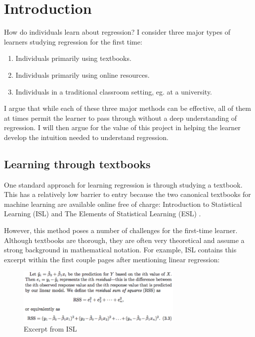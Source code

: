 \documentclass{acm_proc_article-sp}
\begin{document}
\section{Introduction}

How do individuals learn about regression? I consider three major types of
learners studying regression for the first time:

\begin{enumerate}
  \item Individuals primarily using textbooks.
  \item Individuals primarily using online resources.
  \item Individuals in a traditional classroom setting, eg. at a university.
\end{enumerate}

I argue that while each of these three major methods can be effective, all of
them at times permit the learner to pass through without a deep understanding
of regression. I will then argue for the value of this project in helping the
learner develop the intuition needed to understand regression.

\subsection{Learning through textbooks}

One standard approach for learning regression is through studying a textbook.
This has a relatively low barrier to entry because the two canonical textbooks
for machine learning are available online free of charge: Introduction to
Statistical Learning (ISL) and The Elements of Statistical Learning (ESL)
\cite{James:2014:ISL:2517747} \cite{hastie01statisticallearning}.

However, this method poses a number of challenges for the first-time learner.
Although textbooks are thorough, they are often very theoretical and assume a
strong background in mathematical notation. For example, ISL contains this
excerpt within the first couple pages after mentioning linear regression:

\begin{figure}[h]
\caption{Excerpt from ISL}
\includegraphics[width=8cm]{images/isl.png}
\end{figure}
\end{document}
